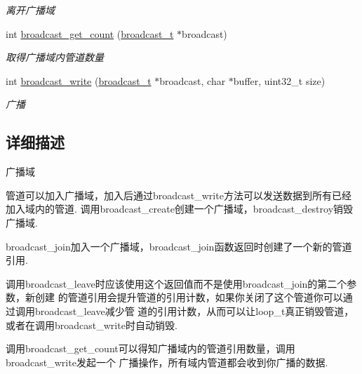 \begin{DoxyCompactItemize}
\begin{DoxyCompactList}\small\item\em 离开广播域 \end{DoxyCompactList}\item 
int \hyperlink{a00100_gacd045b1ca8be7fa8fac6e337934acc97_gacd045b1ca8be7fa8fac6e337934acc97}{broadcast\+\_\+get\+\_\+count} (\hyperlink{a00050_ac970c5deaf6417a866aabed01cd57b1b_ac970c5deaf6417a866aabed01cd57b1b}{broadcast\+\_\+t} $\ast$broadcast)
\begin{DoxyCompactList}\small\item\em 取得广播域内管道数量 \end{DoxyCompactList}\item 
int \hyperlink{a00100_ga0e8a8826a84c9c93a96e0fda1ca846aa_ga0e8a8826a84c9c93a96e0fda1ca846aa}{broadcast\+\_\+write} (\hyperlink{a00050_ac970c5deaf6417a866aabed01cd57b1b_ac970c5deaf6417a866aabed01cd57b1b}{broadcast\+\_\+t} $\ast$broadcast, char $\ast$buffer, uint32\+\_\+t size)
\begin{DoxyCompactList}\small\item\em 广播 \end{DoxyCompactList}\end{DoxyCompactItemize}


\subsection{详细描述}
广播域 


\begin{DoxyPre}
管道可以加入广播域，加入后通过broadcast\_write方法可以发送数据到所有已经加入域内的管道.
调用broadcast\_create创建一个广播域，broadcast\_destroy销毁广播域.\end{DoxyPre}



\begin{DoxyPre}broadcast\_join加入一个广播域，broadcast\_join函数返回时创建了一个新的管道引用.\end{DoxyPre}



\begin{DoxyPre}调用broadcast\_leave时应该使用这个返回值而不是使用broadcast\_join的第二个参数，新创建
的管道引用会提升管道的引用计数，如果你关闭了这个管道你可以通过调用broadcast\_leave减少管
道的引用计数，从而可以让loop\_t真正销毁管道，或者在调用broadcast\_write时自动销毁.\end{DoxyPre}



\begin{DoxyPre}调用broadcast\_get\_count可以得知广播域内的管道引用数量，调用broadcast\_write发起一个
广播操作，所有域内管道都会收到你广播的数据.
\end{DoxyPre}
 

